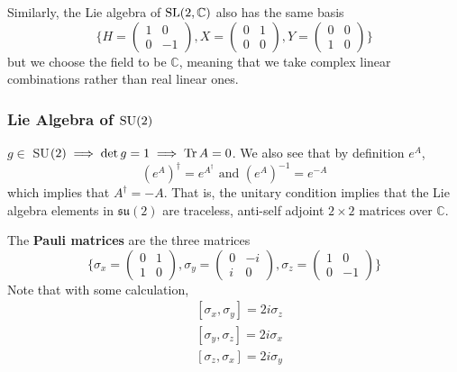     Similarly, the Lie algebra of $\operatorname{SL}(2, \mathbb{C})$ also has the same basis 
    \begin{equation}
      \bigg\{ H = \begin{pmatrix}
      1&0\\0&-1
      \end{pmatrix}, X = \begin{pmatrix}
      0&1\\0&0
      \end{pmatrix}, Y = \begin{pmatrix}
      0&0\\1&0
      \end{pmatrix}\bigg\}
    \end{equation}
    but we choose the field to be $\mathbb{C}$, meaning that we take complex linear combinations rather than real linear ones. 

  \subsubsection[Lie Algebra of SU(2)]{Lie Algebra of \(\operatorname{SU}(2)\)}

    $g \in $ SU$(2) \implies \det{g} = 1 \implies \operatorname{Tr}{A} = 0$. We also see that by definition $e^A$, 
    \begin{equation}
      (e^A)^\dagger = e^{A^\dagger} \text{ and } (e^A)^{-1} = e^{-A}
    \end{equation}
    which implies that $A^\dagger = - A$. That is, the unitary condition implies that the Lie algebra elements in $\mathfrak{su}(2)$ are traceless, anti-self adjoint $2 \times 2$ matrices over $\mathbb{C}$. 

    \begin{definition}
      The \textbf{Pauli matrices} are the three matrices
      \begin{equation}
        \bigg\{ \sigma_x = \begin{pmatrix}
        0&1\\1&0
        \end{pmatrix}, \sigma_y = \begin{pmatrix}
        0&-i\\i&0
        \end{pmatrix}, \sigma_z = \begin{pmatrix}
        1&0\\0&-1
        \end{pmatrix}\bigg\}
      \end{equation}
      Note that with some calculation, 
      \begin{align*}
        & [\sigma_x, \sigma_y] = 2 i \sigma_z \\
        & [\sigma_y, \sigma_z] = 2 i \sigma_x \\
        & [\sigma_z, \sigma_x] = 2 i \sigma_y
      \end{align*}
    \end{definition}

